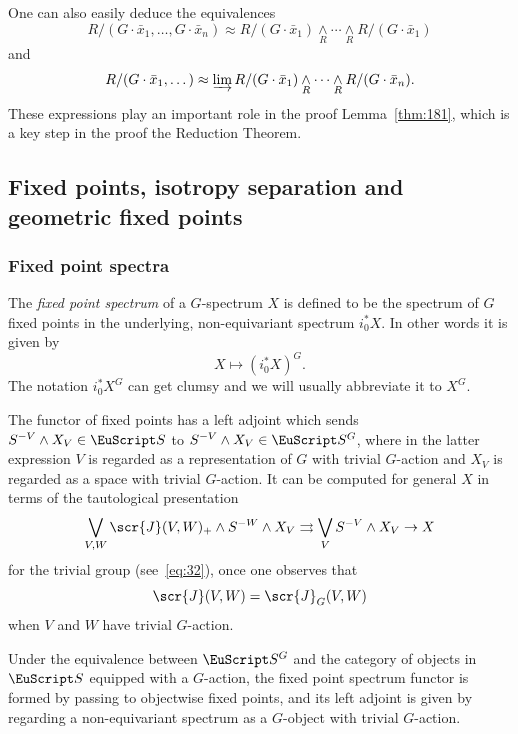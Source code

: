 \documentclass{amsart}
\theoremstyle{definition}
\theoremstyle{remark}
\newcommand{\spectra}{\EuScript S}
\newcommand{\smashove}[1]{\underset{#1}{\wedge}}
\newcommand{\gbar}{\bar}
\newcommand{\icat}{\scr{J}}
\newcommand{\igcat}[1]{\icat_{#1}}
\newcommand{\ugspectra}[1]{\spectra^{#1}}
\begin{document}
One can also easily deduce the equivalences
\begin{equation}
\label{eq:64} 
R/(G\cdot\gbar{x}_{1},\dots,G\cdot\gbar{x}_{n}) \approx
R/(G\cdot\gbar{x}_{1})\smashove{R}\cdots\smashove{R}R/(G\cdot\gbar{x}_{1})
\end{equation}
and
\begin{equation}
\label{eq:65} R/(G\cdot\gbar{x}_{1},\dots) \approx \varinjlim
R/(G\cdot\gbar{x}_{1})\smashove{R}\cdots\smashove{R}
R/(G\cdot\gbar{x}_{n}).
\end{equation}
These expressions play an important role in the proof
Lemma~\ref{thm:181}, which is a key step in the proof the Reduction
Theorem.

\subsection{Fixed points, isotropy separation and geometric fixed points}

\subsubsection{Fixed point spectra}
\label{sec:fixed-point-spectra}

The {\em fixed point spectrum} of a $G$-spectrum $X$ is defined to be
the spectrum of $G$ fixed points in the underlying, non-equivariant
spectrum $i_{0}^{\ast}X$.    In other words it is given by
\[
X\mapsto (i_{0}^{\ast}X)^{G}.
\]
The notation $i_{0}^{\ast}X^{G}$ can get clumsy and we will usually
abbreviate it to $X^{G}$.  

The functor of fixed points has a left adjoint which sends
$S^{-V}\wedge X_{V}\in \spectra$ to $S^{-V}\wedge X_{V}\in
\ugspectra{G}$, where in the latter expression $V$ is regarded as a
representation of $G$ with trivial $G$-action and $X_{V}$ is regarded
as a space with trivial $G$-action.  It can be computed for general
$X$ in terms of the tautological presentation
\[
\bigvee_{V,W} \icat (V,W)_{+}\wedge S^{-W}\wedge
X_{V}\rightrightarrows
\bigvee_{V} S^{-V}\wedge X_{V} \to X
\]
for the
trivial group (see~\eqref{eq:32}), once one observes that 
\[
\icat (V,W) = 
\igcat G(V,W)
\] 
when $V$ and $W$ have trivial $G$-action.  

Under the equivalence between $\ugspectra{G}$ and the category of
objects in $\spectra$ equipped with a $G$-action, the fixed point
spectrum functor is formed by passing to objectwise fixed points, and
its left adjoint is given by regarding a non-equivariant spectrum as a
$G$-object with trivial $G$-action.
\end{document}
